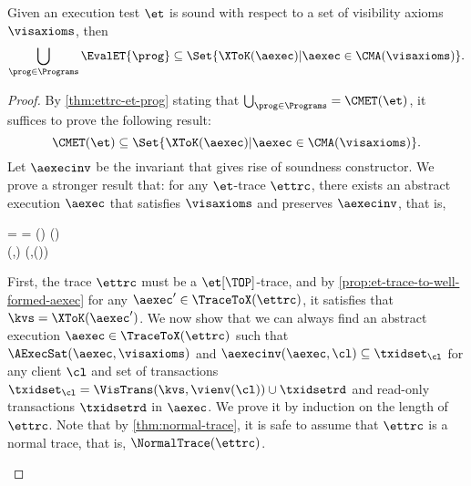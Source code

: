 \begin{toappendix}
\label{sec:proof-et-soundness}
\end{toappendix}
\begin{theoremrep}
Given an execution test \( \et \) is sound with respect to a set of visibility axioms \( \visaxioms \), then 
\[ 
    \bigcup_{\prog \in \Programs} \EvalET{\prog} \subseteq \Set{ \XToK(\aexec)
                | \aexec \in \CMA(\visaxioms) } .
\]
\end{theoremrep}
\begin{proof}
    By \cref{thm:ettrc-et-prog} stating that \( \bigcup_{\prog \in \Programs} = \CMET(\et)\),
    it suffices to prove the following result:
    \[
        \CMET(\et) \subseteq \Set{ \XToK(\aexec) | \aexec \in \CMA(\visaxioms) } .
    \]
    Let \( \aexecinv \) be the invariant that gives rise of soundness constructor.
    We prove a stronger result that: for any \( \et\)-trace \( \ettrc \),
    there exists an abstract execution \( \aexec \) that satisfies \( \visaxioms \) 
    and preserves \( \aexecinv \), that is,
    \begin{Formulae}
    \begin{Formula}
        \ettrc = \ToRed{ \kvsinit | \vienvinit | \stub | * -> \kvs | \vienv }
        \land \kvs = \XToK(\aexec) \land \aexec \in \CMA(\visaxioms) 
        \\ {} \land \Forall{ \cl \in \Dom(\vienv) }
        \aexecinv(\aexec,\cl) \subseteq \VisTrans(\kvs,\vienv(\cl))
        \label{equ:ettrc-to-cma}
    \end{Formula}
    \end{Formulae}
    First, the trace \( \ettrc \) must be a \( \et[\TOP]\)-trace,
    and by \cref{prop:et-trace-to-well-formed-aexec} for any \( \aexec' \in \TraceToX(\ettrc)\),
    it satisfies that \( \kvs = \XToK(\aexec') \).
    We now show that we can always find an abstract execution \( \aexec \in \TraceToX(\ettrc) \)
    such that \( \AExecSat(\aexec,\visaxioms) \) and \( \aexecinv(\aexec,\cl) \subseteq \txidset_\cl \)
    for any client \( \cl \) and set of transactions 
    \( \txidset_\cl = \VisTrans(\kvs,\vienv(\cl)) \cup \txidsetrd \) 
    and read-only transactions \( \txidsetrd\) in \( \aexec \).
    We prove it by induction on the length of \( \ettrc \).
    Note that by \cref{thm:normal-trace}, it is safe to assume that \( \ettrc \) is a normal trace,
    that is, \( \NormalTrace(\ettrc) \).
    \begin{enumerate}
    \CaseBase{\(\ettrc = \ToRed{ \kvsinit | \vienvinit }\)}

\end{enumerate}
\end{proof}
